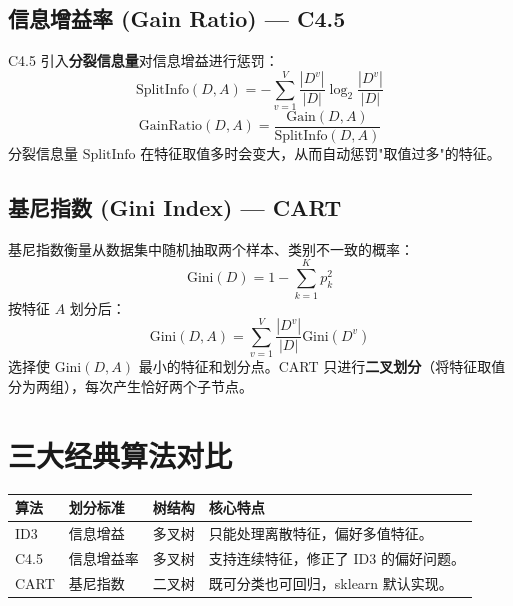 \documentclass[12pt, a4paper]{article}
\begin{document}
\subsection{信息增益率 (Gain Ratio) — C4.5}
C4.5 引入\textbf{分裂信息量}对信息增益进行惩罚：
$$ \text{SplitInfo}(D, A) = -\sum_{v=1}^V \frac{|D^v|}{|D|} \log_2 \frac{|D^v|}{|D|} $$
$$ \text{GainRatio}(D, A) = \frac{\text{Gain}(D, A)}{\text{SplitInfo}(D, A)} $$
分裂信息量 $\text{SplitInfo}$ 在特征取值多时会变大，从而自动惩罚"取值过多"的特征。

\subsection{基尼指数 (Gini Index) — CART}
基尼指数衡量从数据集中随机抽取两个样本、类别不一致的概率：
$$ \text{Gini}(D) = 1 - \sum_{k=1}^K p_k^2 $$
按特征 $A$ 划分后：
$$ \text{Gini}(D, A) = \sum_{v=1}^V \frac{|D^v|}{|D|} \text{Gini}(D^v) $$
选择使 $\text{Gini}(D, A)$ 最小的特征和划分点。CART 只进行\textbf{二叉划分}（将特征取值分为两组），每次产生恰好两个子节点。

\section{三大经典算法对比}
\begin{table}[h]
\centering
\begin{tabularx}{\textwidth}{|l|l|l|X|}
\hline
\textbf{算法} & \textbf{划分标准} & \textbf{树结构} & \textbf{核心特点} \\
\hline
ID3 & 信息增益 & 多叉树 & 只能处理离散特征，偏好多值特征。 \\
\hline
C4.5 & 信息增益率 & 多叉树 & 支持连续特征，修正了 ID3 的偏好问题。 \\
\hline
CART & 基尼指数 & 二叉树 & 既可分类也可回归，sklearn 默认实现。 \\
\hline
\end{tabularx}
\end{table}
\end{document}
